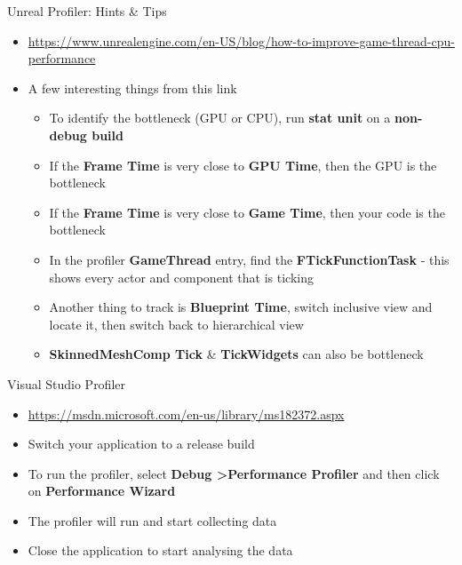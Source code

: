 \begin{frame}{Unreal Profiler: Hints \& Tips}
\begin{itemize}
	\pause \item \url{https://www.unrealengine.com/en-US/blog/how-to-improve-game-thread-cpu-performance}
	\pause \item A few interesting things from this link
	\begin{itemize}
		\pause \item To identify the bottleneck (GPU or CPU), run \textbf{stat unit} on a \textbf{non-debug build}
		\pause \item If the \textbf{Frame Time} is very close to \textbf{GPU Time}, then the GPU is the bottleneck
		\pause \item If the \textbf{Frame Time} is very close to \textbf{Game Time}, then your code is the bottleneck
		\pause \item In the profiler \textbf{GameThread} entry, find the \textbf{FTickFunctionTask} - this shows every actor and component that is ticking
		\pause \item Another thing to track is \textbf{Blueprint Time}, switch inclusive view and locate it, then switch back to hierarchical view
		\pause \item \textbf{SkinnedMeshComp Tick} \& \textbf{TickWidgets} can also be bottleneck
	\end{itemize}
\end{itemize}
\end{frame}

\begin{frame}{ Visual Studio Profiler}
\begin{itemize}
	\pause \item \url{https://msdn.microsoft.com/en-us/library/ms182372.aspx}
	\pause \item Switch your application to a release build
	\pause \item To run the profiler, select \textbf{Debug \textgreater Performance Profiler} and then click on \textbf{Performance Wizard}
	\pause \item The profiler will run and start collecting data
	\pause \item Close the application to start analysing the data
\end{itemize}
\end{frame}


